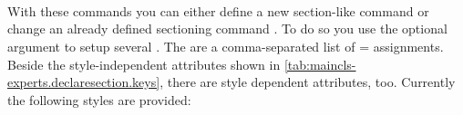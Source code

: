 

\begin{Declaration}
  \\
  \\
  \\
\end{Declaration}
%
%
%
%
With these commands you can either define a new section-like
command  or change an already defined sectioning command
. To do so you use the optional argument to setup several
. The  are a comma-separated list of
= assignments. Beside the style-independent attributes
shown in \autoref{tab:maincls-experts.declaresection.keys}, there are style
dependent attributes, too. Currently the following styles are provided:
